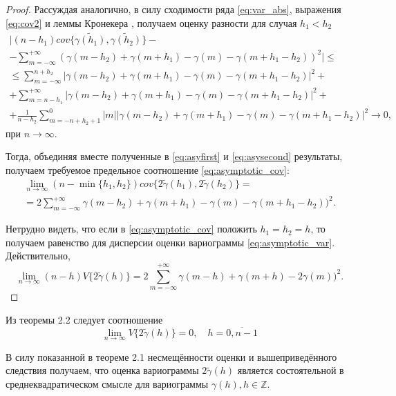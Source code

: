 \begin{proof}
Рассуждая аналогично, в силу сходимости ряда \eqref{eq:var_abs}, выражения \eqref{eq:cov2} и леммы Кронекера \cite{shiryaev1980}, получаем оценку разности для случая $ h_1 < h_2 $
\begin{equation}\begin{gathered}
\label{eq:asysecond}
	\vert (n - h_1) cov \{ \tilde{\gamma(h_1)}, \tilde{\gamma(h_2)} \} - \\
	- \sum_{m = -\infty}^{+ \infty} (\gamma(m - h_2) + \gamma(m + h_1) - \gamma(m) - \gamma(m + h_1 - h_2))^2 \vert \leq \\
	\leq \sum_{m = -\infty}^{n + h_2} \vert \gamma(m - h_2) + \gamma(m + h_1) - \gamma(m) - \gamma(m + h_1 - h_2) \vert^2 + \\
	+ \sum_{m = n - h_1}^{+ \infty} \vert \gamma(m - h_2) + \gamma(m + h_1) - \gamma(m) - \gamma(m + h_1 - h_2) \vert^2 + \\
	+ \frac{1}{n - h_2} \sum_{m = -n + h_2 + 1}^{0} \vert m \vert \vert \gamma(m - h_2) + \gamma(m + h_1) - \gamma(m) - \gamma(m + h_1 - h_2) \vert^2 \to 0,
\end{gathered}\end{equation}
при $ n \to \infty$.

Тогда, объединяя вместе полученные в \eqref{eq:asyfirst} и \eqref{eq:asysecond} результаты, получаем требуемое предельное соотношение \eqref{eq:asymptotic_cov}:
\begin{equation*}\begin{gathered}
	\lim_{n \to \infty} (n - \min\{ h_1, h_2 \}) cov\{ 2 \tilde{\gamma}(h_1), 2 \tilde{\gamma}(h_2) \} = \\
	= 2 \sum_{m = -\infty}^{+\infty} \gamma(m - h_2) + \gamma(m + h_1) - \gamma(m) - \gamma(m + h_1 - h_2))^2.
\end{gathered}\end{equation*}

Нетрудно видеть, что если в \eqref{eq:asymptotic_cov} положить $ h_1 = h_2 = h $, то получаем равенство для дисперсии оценки вариограммы \eqref{eq:asymptotic_var}. Действительно,
\begin{equation*}
	\lim_{n \to \infty} (n - h) V\{ 2 \tilde{\gamma}(h) \} = 2 \sum_{m = -\infty}^{+\infty} \gamma(m - h) + \gamma(m + h) - 2 \gamma(m))^2.
\end{equation*}

\end{proof}

\begin{Corollary}
	Из теоремы 2.2 следует соотношение
	\begin{equation*}
		\lim_{n \to \infty} V\{ 2 \tilde{\gamma}(h) \} = 0, \quad h = \overline{0, n - 1}
	\end{equation*}
\end{Corollary}

\begin{Remark}
	В силу показанной в теореме 2.1 несмещённости оценки и вышеприведённого следствия получаем, что оценка вариограммы $ 2\tilde{\gamma}(h) $ является состоятельной в среднеквадратическом смысле для вариограммы $ \gamma(h), h \in \mathbb{Z} $.
\end{Remark}
